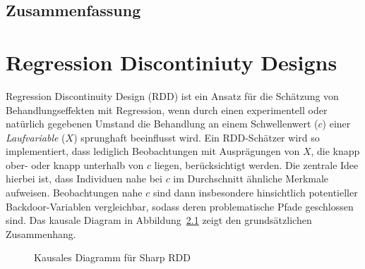 \documentclass[
  a4paper,
  DIV=11,
  oneside]{scrreprt}
\begin{document}
\section{Zusammenfassung}\label{zusammenfassung-1}


\chapter{Regression Discontiniuty
Designs}\label{regression-discontiniuty-designs}

Regression Discontinuity Design (RDD) ist ein Ansatz für die Schätzung
von Behandlungseffekten mit Regression, wenn durch einen experimentell
oder natürlich gegebenen Umstand die Behandlung an einem Schwellenwert
(\(c\)) einer \emph{Laufvariable} (\(X\)) sprunghaft beeinflusst wird.
Ein RDD-Schätzer wird so implementiert, dass lediglich Beobachtungen mit
Ausprägungen von \(X\), die knapp ober- oder knapp unterhalb von \(c\)
liegen, berücksichtigt werden. Die zentrale Idee hierbei ist, dass
Individuen nahe bei \(c\) im Durchschnitt ähnliche Merkmale aufweisen.
Beobachtungen nahe \(c\) sind dann insbesondere hinsichtlich
potentieller Backdoor-Variablen vergleichbar, sodass deren
problematische Pfade geschlossen sind. Das kausale Diagram in
Abbildung~\ref{fig-CDRDD} zeigt den grundsätzlichen Zusammenhang.

\begin{figure}[t]


\caption{\label{fig-CDRDD}Kausales Diagramm für Sharp RDD}

\end{figure}%
\end{document}
